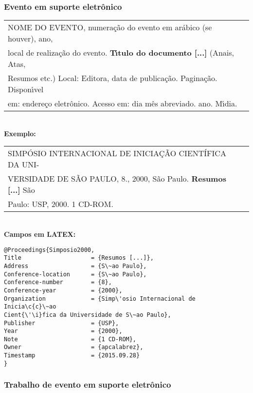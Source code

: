 \subsubsection{Evento em suporte eletr\^onico} 

\begin{tabular}{|l|c|} \hline
	NOME DO EVENTO, numera\c{c}\~ao do evento em ar\'abico (se
	houver), ano, \\local de realiza\c{c}\~ao do evento. \textbf{T\'{\i}tulo do
		documento [...]} (Anais, Atas, \\Resumos etc.)  Local: Editora, data de publica\c{c}\~ao. Pagina\c{c}\~ao. Dispon\'{\i}vel \\ em: endere\c{c}o eletr\^onico. Acesso em: dia m\^es abreviado. ano. M\'{\i}dia.
	\\\hline
\end{tabular} \\

\textbf{Exemplo:} \\

\begin{tabular}{|l|c|} \hline
	SIMP\'OSIO INTERNACIONAL DE INICIA\c{C}\~AO CIENT\'IFICA DA
	UNI-\\VERSIDADE DE S\~AO PAULO, 8., 2000, S\~ao Paulo. \textbf{Resumos [...]}
	S\~ao \\ Paulo: USP, 2000. 1 CD-ROM.  \\\hline
\end{tabular} \\

\textbf{Campos em LATEX:} 

\begin{verbatim}
@Proceedings{Simposio2000,
Title                    = {Resumos [...]},
Address                  = {S\~ao Paulo},
Conference-location      = {S\~ao Paulo},
Conference-number        = {8},
Conference-year          = {2000},
Organization             = {Simp\'osio Internacional de Inicia\c{c}\~ao 
Cient{\'\i}fica da Universidade de S\~ao Paulo},
Publisher                = {USP},
Year                     = {2000},
Note                     = {1 CD-ROM},
Owner                    = {apcalabrez},
Timestamp                = {2015.09.28}
}
\end{verbatim}

\subsubsection{Trabalho de evento em suporte eletr\^onico}


